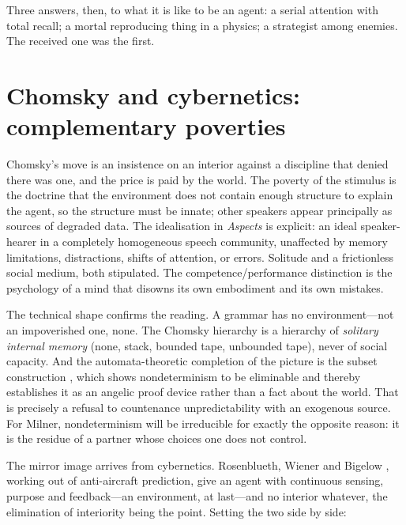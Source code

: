\documentclass[11pt,a4paper]{article}
\begin{document}
Three answers, then, to what it is like to be an agent: a serial attention with
total recall; a mortal reproducing thing in a physics; a strategist among
enemies. The received one was the first.

\section{Chomsky and cybernetics: complementary poverties}

Chomsky's move \cite{chomsky1956,chomsky1957,chomsky1959} is an insistence on an
interior against a discipline that denied there was one, and the price is paid by
the world. The poverty of the stimulus is the doctrine that the environment does
not contain enough structure to explain the agent, so the structure must be
innate; other speakers appear principally as sources of degraded data. The
idealisation in \emph{Aspects} \cite{chomsky1965} is explicit: an ideal
speaker-hearer in a completely homogeneous speech community, unaffected by memory
limitations, distractions, shifts of attention, or errors. Solitude and a
frictionless social medium, both stipulated. The competence/performance
distinction is the psychology of a mind that disowns its own embodiment and its
own mistakes.

The technical shape confirms the reading. A grammar has no environment---not an
impoverished one, none. The Chomsky hierarchy is a hierarchy of \emph{solitary
internal memory} (none, stack, bounded tape, unbounded tape), never of social
capacity. And the automata-theoretic completion of the picture is the subset
construction \cite{rabinscott1959}, which shows nondeterminism to be eliminable
and thereby establishes it as an angelic proof device rather than a fact about the
world. That is precisely a refusal to countenance unpredictability with an
exogenous source. For Milner, nondeterminism will be irreducible for exactly the
opposite reason: it is the residue of a partner whose choices one does not
control.

The mirror image arrives from cybernetics. Rosenblueth, Wiener and Bigelow
\cite{rwb1943}, working out of anti-aircraft prediction, give an agent with
continuous sensing, purpose and feedback---an environment, at last---and no
interior whatever, the elimination of interiority being the point. Setting the two
side by side:
\end{document}
